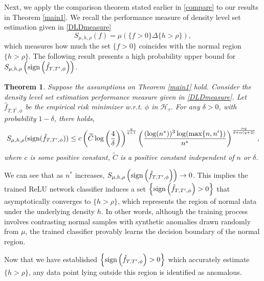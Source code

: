 \documentclass{article}
\newtheorem{theorem}{Theorem}
\begin{document}
Next, we apply the comparison theorem stated earlier in \eqref{compare} to our results in Theorem \ref{main1}. 
We recall the performance measure of density level set estimation given in \eqref{DLDmeasure}
\begin{equation}
    S_{\mu,h,\rho}(f)= \mu\left(\{f>0\}\Delta\{h>\rho\}\right),
\end{equation}
which measures how much the set $\{f>0\}$ coincides with the normal region $\{h>\rho\}$.
The following result presents a high probability upper bound for $S_{\mu,h,\rho}\left(\text{sign}\left(\Hat{f}_{T, T^\prime,\phi}\right)\right)$.
\begin{theorem}\label{main2}
Suppose the assumptions on Theorem \ref{main1} hold. Consider the density level set estimation performance measure given in \eqref{DLDmeasure}.
Let $\widehat{f}_{T, T^\prime,\phi}$ be the empirical risk minimizer w.r.t. $\phi$ in $\mathcal{H}_\tau$.
For any $\delta>0 $, with probability $1-\delta$, there holds,
\begin{equation}
    S_{\mu,h,\rho}(\text{sign}(\Hat{f}_{T, T^\prime,\phi}))  \leq c \left(\widetilde{C}\log \left(\frac{4}{\delta}\right) \right)^{\frac{q}{q+1}}\left(\frac{(\log( n^*))^3 \log(\max\{n,n^\prime\})}{n^*}\right)^{\frac{\alpha q}{d+ \alpha (q+2)}},
\end{equation}
where $c$ is some positive constant, $\widetilde{C}$ is a positive constant independent of $n$ or $\delta$. 
\end{theorem}
We can see that as $n^*$ increases, $S_{\mu,h,\rho}\left(\text{sign}\left(\Hat{f}_{T, T^\prime,\phi}\right)\right) \to 0$. This implies the trained ReLU network classifier induces a set $\left\{\text{sign}\left(\Hat{f}_{T, T^\prime,\phi}\right) >0\right\}$ that asymptotically converges to $\{h > \rho\}$, which represents the region of normal data under the underlying density $h$. In other words, although the training process involves contrasting normal samples with synthetic anomalies drawn randomly from $\mu$, the trained classifier provably learns the decision boundary of the normal region. 

Now that we have established $\left\{\text{sign}\left(\Hat{f}_{T, T^\prime,\phi}\right) >0\right\}$ which accurately estimate $\{h > \rho\}$, any data point lying outside this region is identified as anomalous.




\end{document}
